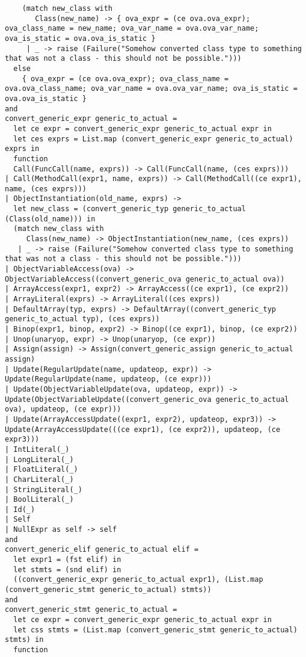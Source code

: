 \documentclass{article}
\begin{document}
\begin{verbatim}
    (match new_class with
       Class(new_name) -> { ova_expr = (ce ova.ova_expr); ova_class_name = new_name; ova_var_name = ova.ova_var_name; ova_is_static = ova.ova_is_static }
     | _ -> raise (Failure("Somehow converted class type to something that was not a class - this should not be possible.")))
  else
    { ova_expr = (ce ova.ova_expr); ova_class_name = ova.ova_class_name; ova_var_name = ova.ova_var_name; ova_is_static = ova.ova_is_static }
and
convert_generic_expr generic_to_actual =
  let ce expr = convert_generic_expr generic_to_actual expr in
  let ces exprs = List.map (convert_generic_expr generic_to_actual) exprs in
  function
  Call(FuncCall(name, exprs)) -> Call(FuncCall(name, (ces exprs)))
| Call(MethodCall(expr1, name, exprs)) -> Call(MethodCall((ce expr1), name, (ces exprs)))
| ObjectInstantiation(old_name, exprs) ->
  let new_class = (convert_generic_typ generic_to_actual (Class(old_name))) in
  (match new_class with
     Class(new_name) -> ObjectInstantiation(new_name, (ces exprs))
   | _ -> raise (Failure("Somehow converted class type to something that was not a class - this should not be possible.")))
| ObjectVariableAccess(ova) -> ObjectVariableAccess((convert_generic_ova generic_to_actual ova))
| ArrayAccess(expr1, expr2) -> ArrayAccess((ce expr1), (ce expr2))
| ArrayLiteral(exprs) -> ArrayLiteral((ces exprs))
| DefaultArray(typ, exprs) -> DefaultArray((convert_generic_typ generic_to_actual typ), (ces exprs))
| Binop(expr1, binop, expr2) -> Binop((ce expr1), binop, (ce expr2))
| Unop(unaryop, expr) -> Unop(unaryop, (ce expr))
| Assign(assign) -> Assign(convert_generic_assign generic_to_actual assign)
| Update(RegularUpdate(name, updateop, expr)) -> Update(RegularUpdate(name, updateop, (ce expr)))
| Update(ObjectVariableUpdate(ova, updateop, expr)) -> Update(ObjectVariableUpdate((convert_generic_ova generic_to_actual ova), updateop, (ce expr)))
| Update(ArrayAccessUpdate((expr1, expr2), updateop, expr3)) -> Update(ArrayAccessUpdate(((ce expr1), (ce expr2)), updateop, (ce expr3)))
| IntLiteral(_)
| LongLiteral(_)
| FloatLiteral(_)
| CharLiteral(_)
| StringLiteral(_)
| BoolLiteral(_)
| Id(_)
| Self
| NullExpr as self -> self
and
convert_generic_elif generic_to_actual elif =
  let expr1 = (fst elif) in
  let stmts = (snd elif) in
  ((convert_generic_expr generic_to_actual expr1), (List.map (convert_generic_stmt generic_to_actual) stmts))
and
convert_generic_stmt generic_to_actual =
  let ce expr = convert_generic_expr generic_to_actual expr in
  let css stmts = (List.map (convert_generic_stmt generic_to_actual) stmts) in
  function

\end{verbatim}
\end{document}
